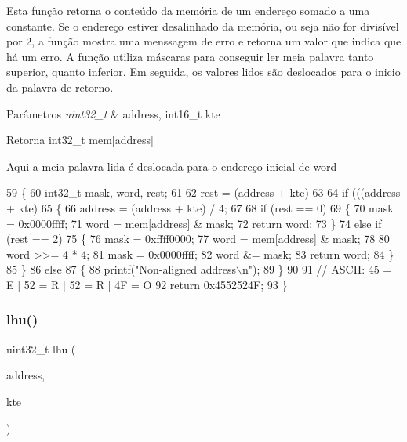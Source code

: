Esta função retorna o conteúdo da memória de um endereço somado a uma constante. Se o endereço estiver desalinhado da memória, ou seja não for divisível por 2, a função mostra uma menssagem de erro e retorna um valor que indica que há um erro. A função utiliza máscaras para conseguir ler meia palavra tanto superior, quanto inferior. Em seguida, os valores lidos são deslocados para o inicio da palavra de retorno. 
\begin{DoxyParams}{Parâmetros}
{\em uint32\+\_\+t} & address, int16\+\_\+t kte \\
\hline
\end{DoxyParams}
\begin{DoxyReturn}{Retorna}
int32\+\_\+t mem[address] 
\end{DoxyReturn}
Aqui a meia palavra lida é deslocada para o endereço inicial de word 
\begin{DoxyCode}
59 \{
60     int32\_t mask, word, rest;
61 
62     rest = (address + kte) %
63 
64     \textcolor{keywordflow}{if} (((address + kte) %
65     \{
66         address = (address + kte) / 4;
67 
68         \textcolor{keywordflow}{if} (rest == 0)
69         \{
70             mask = 0x0000ffff;
71             word = mem[address] & mask;
72             \textcolor{keywordflow}{return} word;
73         \}
74         \textcolor{keywordflow}{else} \textcolor{keywordflow}{if} (rest == 2)
75         \{
76             mask = 0xffff0000;
77             word = mem[address] & mask;
78 
80             word >>= 4 * 4;
81             mask = 0x0000ffff;
82             word &= mask;
83             \textcolor{keywordflow}{return} word;
84         \}
85     \}
86     \textcolor{keywordflow}{else}
87     \{
88         printf(\textcolor{stringliteral}{"Non-aligned address\(\backslash\)n"});
89     \}
90 
91     \textcolor{comment}{// ASCII: 45 = E | 52 = R | 52 = R | 4F = O}
92     \textcolor{keywordflow}{return} 0x4552524F;
93 \}
\end{DoxyCode}
\mbox{\label{memory_8c_a552ff2abf787e5aaf4d34c3b6c769eed}} 
\subsubsection{lhu()}
{\footnotesize\ttfamily uint32\+\_\+t lhu (\begin{DoxyParamCaption}\item[{uint32\+\_\+t}]{address,  }\item[{int16\+\_\+t}]{kte }\end{DoxyParamCaption})}



